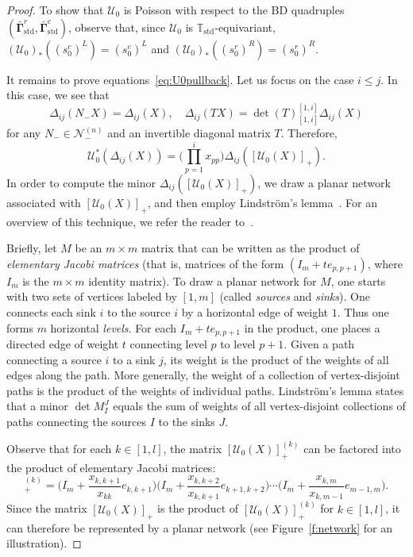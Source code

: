 \documentclass[11pt]{article}
\newcommand{\bbg}{\bar{\mathbf{\Gamma}}}
\newcommand{\std}{\mathrm{std}}
\theoremstyle{definition}\newtheorem{definition}[theorem]{Definition}
\theoremstyle{definition}\newtheorem{remark}[theorem]{Remark}
\theoremstyle{remark}
\numberwithin{equation}{section}
\begin{document}
\begin{proof}
    To show that $\mathcal{U}_0$ is Poisson with respect to the BD quadruples $(\bbg_{\std}^r,\bbg_{\std}^c)$, observe that, since $\mathcal{U}_0$ is $\mathbb{T}_{\std}$-equivariant, $(\mathcal{U}_0)_*((s_0^c)^L) = (s_0^c)^L$ and $(\mathcal{U}_0)_*((s_0^r)^R) = (s_0^r)^R$.
    
    It remains to prove equations~\eqref{eq:U0pullback}. Let us focus on the case $i \leq j$. In this case, we see that 
    \begin{equation*}
        \Delta_{ij}(N_-X) = \Delta_{ij}(X), \quad \Delta_{ij}(TX) = \det(T)_{[1,i]}^{[1,i]} \Delta_{ij}(X)
    \end{equation*}
    for any $N_- \in \mathcal{N}_-^{(n)}$ and an invertible diagonal matrix $T$. Therefore,
    \begin{equation*}
        \mathcal{U}_0^*(\Delta_{ij}(X)) =\Big(\prod_{p=1}^i x_{pp}\Big) \Delta_{ij}([\mathcal{U}_0(X)]_+).
    \end{equation*}
    In order to compute the minor $\Delta_{ij}([\mathcal{U}_0(X)]_+)$, we draw a planar network associated with $[\mathcal{U}_0(X)]_+$, and then employ Lindstr\"om's lemma~\cite{lindstr-lemma}.
    For an overview of this technique, we refer the reader to~\cite{fz-total}. 

    Briefly, let $M$ be an $m \times m$ matrix that can be written as the product of \emph{elementary Jacobi matrices} (that is, matrices of the form $(I_m + t e_{p,p+1})$, where $I_m$ is the $m \times m$ identity matrix). To draw a planar network for $M$, one starts with two sets of vertices labeled by $[1,m]$ (called \emph{sources} and \emph{sinks}). One connects each sink $i$ to the source $i$ by a horizontal edge of weight $1$. Thus one forms $m$ horizontal \emph{levels}. For each $I_m + t e_{p,p+1}$ in the product, one places a directed edge of weight $t$ connecting level $p$ to level $p+1$. Given a path connecting a source $i$ to a sink $j$, its weight is the product of the weights of all edges along the path. More generally, the weight of a collection of vertex-disjoint paths is the product of the weights of individual paths. Lindstr\"om's lemma states that a minor $\det M_{I}^J$ equals the sum of weights of all vertex-disjoint collections of paths connecting the sources $I$ to the sinks $J$.
    
    Observe that for each $k \in [1,l]$, the matrix $[\mathcal{U}_0(X)]_+^{(k)}$ can be factored into the product of elementary Jacobi matrices:
    \begin{equation*}
        [\mathcal{U}_0(X)]_+^{(k)} = \Big(I_m + \frac{x_{k,k+1}}{x_{kk}}e_{k,k+1}\Big)\Big(I_m + \frac{x_{k,k+2}}{x_{k,k+1}}e_{k+1,k+2}\Big) \cdots \Big(I_m + \frac{x_{k,m}}{x_{k,m-1}}e_{m-1,m}\Big).
    \end{equation*}
    Since the matrix $[\mathcal{U}_0(X)]_+$ is the product of $[\mathcal{U}_0(X)]_+^{(k)}$ for $k \in [1,l]$, it can therefore be represented by a planar network (see Figure~\ref{f:network} for an illustration).  


\end{proof}
\end{document}
